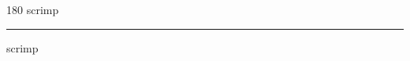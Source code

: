 
\begin{frame}
\begin{center}
\begin{turn}{180}
{\fontsize{2.5cm}{1em}\selectfont scrimp}
\end{turn}
\vspace{1em}\par  
\hrule
\vspace{1em}\par  
{\fontsize{2.5cm}{1em}\selectfont scrimp}
\end{center}
\end{frame}
